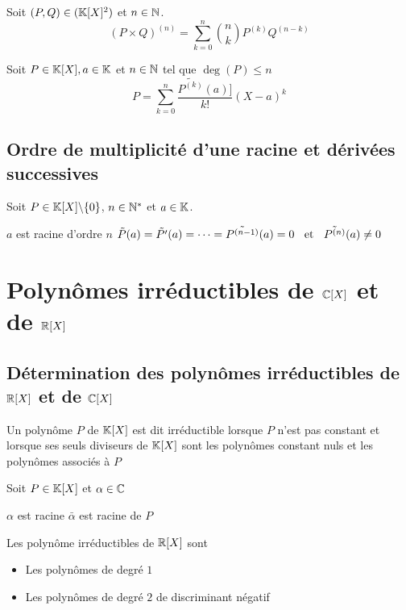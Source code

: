 \begin{prp}
  Soit $(P, Q) \in (\mathbb{K}[X]^2)$ et $n \in \mathbb{N}$.
  \[
    (P \times Q)^{(n)} = \sum^n_{k = 0} \binom{n}{k} P^{(k)} Q^{(n - k)}
  \]
\end{prp}

\begin{prp}
  Soit $P \in \mathbb{K}[X], a \in \mathbb{K}$ et $n \in \mathbb{N}$ tel que $\deg(P) \leq n$
  \[
    P = \sum^n_{k = 0} \frac{\tilde{P^{(k)}}(a)]}{k!} (X - a)^k
  \]
\end{prp}

\subsection{Ordre de multiplicité d'une racine et dérivées successives}

\begin{prp}
  Soit $P \in \mathbb{K}[X] \backslash \{0\}$, $n \in \mathbb{N}^*$ et $a \in \mathbb{K}$.

  $a$ est racine d'ordre $n$ \ssi $\tilde{P}(a) = \tilde{P'}(a) = \cdots =
  \tilde{P^{(n - 1)}}(a) = 0 \;\;\text{ et }\;\; \tilde{P^{(n)}}(a) \neq 0$
\end{prp}

\section{Polynômes irréductibles de $\mathbb{C}[X]$ et de $\mathbb{R}[X]$}

\subsection{Détermination des polynômes irréductibles de $\mathbb{R}[X]$ et de
$\mathbb{C}[X]$}

\begin{dfn}
Un polynôme $P$ de $\mathbb{K}[X]$ est dit irréductible lorsque $P$ n'est pas
constant et lorsque ses seuls diviseurs de $\mathbb{K}[X]$ sont les polynômes
constant nuls et les polynômes associés à $P$
\end{dfn}

\begin{prp}
Soit $P \in \mathbb{K}[X]$ et $\alpha \in \mathbb{C}$

$\alpha$ est racine \ssi $\bar{\alpha}$ est racine de $P$
\end{prp}

\begin{thm}
Les polynôme irréductibles de $\mathbb{R}[X]$ sont
\begin{itemize}
    \item Les polynômes de degré $1$
    \item Les polynômes de degré $2$ de discriminant négatif
\end{itemize}
\end{thm}

